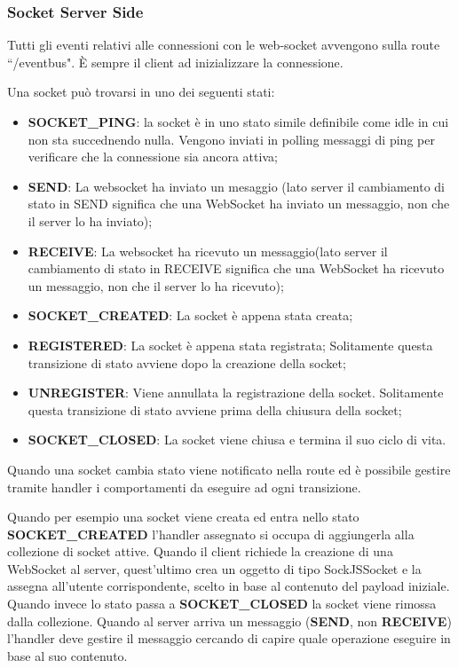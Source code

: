 \subsubsection{Socket Server Side}
Tutti gli eventi relativi alle connessioni con le web-socket avvengono sulla route ``/eventbus".\newline
È sempre il client ad inizializzare la connessione.\newline

\noindent Una socket può trovarsi in uno dei seguenti stati:
\begin{itemize}
    \item \textbf{SOCKET\_PING}: la socket è in uno stato simile definibile come idle in cui non sta succednendo nulla. Vengono inviati in polling messaggi di ping per verificare che la connessione sia ancora attiva;
    \item \textbf{SEND}: La websocket ha inviato un mesaggio (lato server il cambiamento di stato in SEND significa che una WebSocket ha inviato un messaggio, non che il server lo ha inviato);
    \item \textbf{RECEIVE}: La websocket ha ricevuto un messaggio(lato server il cambiamento di stato in RECEIVE significa che una WebSocket ha ricevuto un messaggio, non che il server lo ha ricevuto);
    \item \textbf{SOCKET\_CREATED}: La socket è appena stata creata;
    \item \textbf{REGISTERED}: La socket è appena stata registrata; Solitamente questa transizione di stato avviene dopo la creazione della socket;
    \item \textbf{UNREGISTER}: Viene annullata la registrazione della socket. Solitamente questa transizione di stato avviene prima della chiusura della socket;
    \item \textbf{SOCKET\_CLOSED}: La socket viene chiusa e termina il suo ciclo di vita.
\end{itemize}
\noindent Quando una socket cambia stato viene notificato nella route ed è possibile gestire tramite handler i comportamenti da eseguire ad ogni transizione.
\begin{info}
Quando per esempio una socket viene creata ed entra nello stato \textbf{SOCKET\_CREATED} l'handler assegnato si occupa di aggiungerla alla collezione di socket attive.
Quando il client richiede la creazione di una WebSocket al server, quest'ultimo crea un oggetto di tipo SockJSSocket e la assegna all'utente corrispondente, scelto in base al contenuto del payload iniziale.\newline
Quando invece lo stato passa a \textbf{SOCKET\_CLOSED} la socket viene rimossa dalla collezione.
Quando al server arriva un messaggio (\textbf{SEND}, non \textbf{RECEIVE}) l'handler deve gestire il messaggio cercando di capire quale operazione eseguire in base al suo contenuto.
\end{info}

